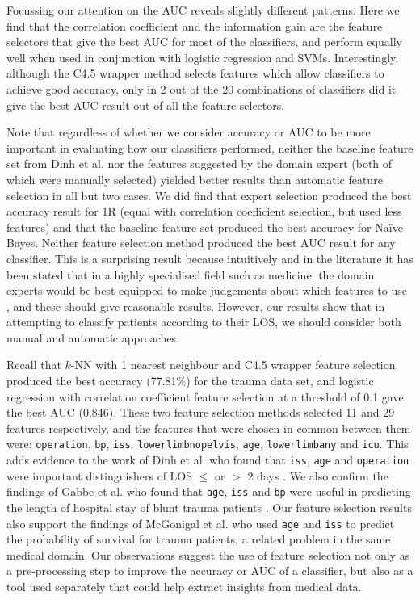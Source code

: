 


Focussing our attention on the AUC reveals slightly different patterns. Here we
find that the correlation coefficient and the information gain are the feature
selectors that give the best AUC for most of the classifiers, and perform
equally well when used in conjunction with logistic regression and SVMs.
Interestingly, although the C4.5
wrapper method selects features which allow classifiers to achieve good
accuracy, only in 2 out of the 20 combinations of classifiers did it give the
best AUC result out of all the feature selectors. 

Note that regardless of whether we consider accuracy or AUC to be more
important in evaluating how our classifiers performed, neither the baseline
feature set from Dinh et al. \cite{Dinh2013a} nor the features suggested by
the domain expert (both of which were manually selected) yielded better
results than automatic feature selection in all but two cases. We did find
that expert selection produced the best accuracy result for 1R (equal with
correlation coefficient selection, but used less features) and that the
baseline feature set produced the best accuracy for Na\"{i}ve Bayes. Neither
feature selection method produced the best AUC result for any classifier.
This is a surprising result because intuitively and in the literature it
has been stated that in a highly specialised field such as medicine, the domain
experts would be best-equipped to make judgements about which features to
use \cite{Witten2005}, and these should give reasonable results. However,
our results show that in attempting to classify patients according to their
LOS, we should consider both manual and automatic approaches.

Recall that $k$-NN with 1 nearest neighbour and C4.5 wrapper feature
selection produced the best accuracy (77.81\%) for the trauma data set, and
logistic regression with correlation coefficient feature selection at a
threshold of 0.1 gave the best AUC (0.846). These two feature selection
methods selected 11 and 29 features respectively, and the features that
were chosen in common between them were: \texttt{operation}, \texttt{bp},
\texttt{iss}, \texttt{lowerlimbnopelvis}, \texttt{age}, \texttt{lowerlimbany}
and \texttt{icu}. This adds evidence to the work of Dinh et al. who found
that \texttt{iss}, \texttt{age} and \texttt{operation} were important
distinguishers of LOS $\leq$ or $>$ 2 days \cite{Dinh2013a}. We also
confirm the findings of Gabbe et al. who found that \texttt{age},
\texttt{iss} and \texttt{bp} were useful in predicting the length of
hospital stay of blunt trauma patients \cite{Gabbe2005}. Our feature
selection results also
support the findings of McGonigal et al. \cite{McGonigal1993} who used
\texttt{age} and
\texttt{iss} to predict the probability of survival for trauma patients, a
related problem in the same medical domain.
Our observations suggest the use of feature selection not only as a
pre-processing step to improve the accuracy or AUC of a classifier, but also
as a tool used separately that could help extract insights from medical data.

